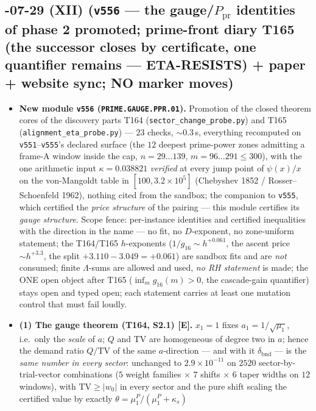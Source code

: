 \documentclass[11pt]{article}
\providecommand{\mE}{\textbf{[E]}}\providecommand{\mC}{\textbf{[C]}}
\begin{document}
\subsection*{-07-29 (XII) (\texttt{v556} --- the gauge/$P_{\mathrm{pr}}$ identities of phase 2 promoted; prime-front diary T165 (the successor closes by certificate, one quantifier remains --- ETA-RESISTS) + paper + website sync; NO marker moves)}
\begin{itemize}[leftmargin=1.5em]
\item \textbf{New module \texttt{v556} (\texttt{PRIME.GAUGE.PPR.01}).} Promotion of
the closed theorem cores of the discovery parts T164 (\texttt{sector\_change\_probe.py})
and T165 (\texttt{alignment\_eta\_probe.py}) --- $23$ checks, ${\sim}0.3$\,s, everything
recomputed on \texttt{v551}--\texttt{v555}'s declared surface (the $12$ deepest
prime-power zones admitting a frame-A window inside the cap, $n=29\ldots139$,
$m=96\ldots291\le300$), with the one arithmetic input $\kappa=0.038821$
\emph{verified} at every jump point of $\psi(x)/x$ on the von-Mangoldt table in
$[100,3.2\times10^{5}]$ (Chebyshev 1852 / Rosser--Schoenfeld 1962), nothing cited from
the sandbox; the companion to \texttt{v555}, which certified the \emph{price
structure} of the pairing --- this module certifies its \emph{gauge structure}. Scope
fence: per-instance identities and certified inequalities with the direction in the
name --- no fit, no $D$-exponent, no zone-uniform statement; the T164/T165
$h$-exponents ($1/g_{16}\sim h^{+0.061}$, the ascent price $\sim h^{+3.3}$, the split
$+3.110-3.049=+0.061$) are sandbox fits and are \emph{not} consumed; finite
$\Lambda$-sums are allowed and used, \emph{no RH statement} is made; the ONE open
object after T165 ($\inf_m g_{16}(m)>0$, the cascade-gain quantifier) stays open and
typed open; each statement carries at least one mutation control that must fail
loudly.
\item \textbf{(1) The gauge theorem (T164, S2.1) \mE.} $x_1=1$ fixes
$a_1=1/\sqrt{\mu_1}$, i.e.\ only the \emph{scale} of $a$; $Q$ and TV are homogeneous
of degree two in $a$; hence the demand ratio $Q/\mathrm{TV}$ of the same
$a$-direction --- and with it $\delta_{\mathrm{bnd}}$ --- is the \emph{same number in
every sector}: unchanged to $2.9\times10^{-11}$ on $2520$ sector-by-trial-vector
combinations ($5$ weight families $\times$ $7$ shifts $\times$ $6$ taper widths on
$12$ windows), with $\mathrm{TV}\ge|w_0|$ in every sector and the pure shift scaling
the certified value by exactly $\theta=\mu^P_1/(\mu^P_1+\kappa_s)$

\end{itemize}
\end{document}
